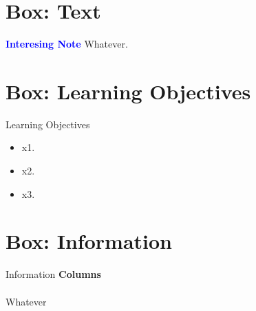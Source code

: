 \section{Box: Text}
\begin{tcolorbox}[colback=blue!5!white,colframe=blue!75!black]
	\textcolor{blue}{\textbf{Interesing Note}}
	\tcblower
	Whatever.
\end{tcolorbox}

\section{Box: Learning Objectives}
\begin{center}
	\begin{objbox}{Learning Objectives}
		\begin{itemize}
			\setlength{\itemsep}{0pt}
			\setlength{\parskip}{0pt}
			\setlength{\parsep}{0pt}
		
			\item x1.
			\item x2.
			\item x3.
		\end{itemize}
	\end{objbox}
\end{center}

\section{Box: Information}
\begin{center}
	\begin{infobox}{Information}
		\textbf{Columns}
		\\
		\\
		Whatever
	\end{infobox}
\end{center}

